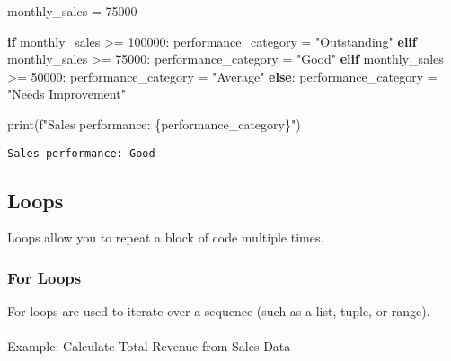 \documentclass[
  letterpaper,
  DIV=11,
  numbers=noendperiod]{scrreprt}
\makeatletter
\let\oldparagraph\paragraph
\renewcommand{\paragraph}{
    \@ifstar
      \xxxParagraphStar
      \xxxParagraphNoStar
  }
\newcommand{\xxxParagraphStar}[1]{\oldparagraph*{#1}\mbox{}}
\newcommand{\xxxParagraphNoStar}[1]{\oldparagraph{#1}\mbox{}}
\newenvironment{Shaded}{\begin{snugshade}}{\end{snugshade}}
\newcommand{\BuiltInTok}[1]{\textcolor[rgb]{0.00,0.23,0.31}{#1}}
\newcommand{\ControlFlowTok}[1]{\textcolor[rgb]{0.00,0.23,0.31}{\textbf{#1}}}
\newcommand{\DecValTok}[1]{\textcolor[rgb]{0.68,0.00,0.00}{#1}}
\newcommand{\KeywordTok}[1]{\textcolor[rgb]{0.00,0.23,0.31}{\textbf{#1}}}
\newcommand{\NormalTok}[1]{\textcolor[rgb]{0.00,0.23,0.31}{#1}}
\newcommand{\OperatorTok}[1]{\textcolor[rgb]{0.37,0.37,0.37}{#1}}
\newcommand{\SpecialCharTok}[1]{\textcolor[rgb]{0.37,0.37,0.37}{#1}}
\newcommand{\SpecialStringTok}[1]{\textcolor[rgb]{0.13,0.47,0.30}{#1}}
\newcommand{\StringTok}[1]{\textcolor[rgb]{0.13,0.47,0.30}{#1}}
\makeatother
\begin{document}
\begin{Shaded}
\begin{Highlighting}[]
\NormalTok{monthly\_sales }\OperatorTok{=} \DecValTok{75000}

\ControlFlowTok{if}\NormalTok{ monthly\_sales }\OperatorTok{\textgreater{}=} \DecValTok{100000}\NormalTok{:}
\NormalTok{    performance\_category }\OperatorTok{=} \StringTok{"Outstanding"}
\ControlFlowTok{elif}\NormalTok{ monthly\_sales }\OperatorTok{\textgreater{}=} \DecValTok{75000}\NormalTok{:}
\NormalTok{    performance\_category }\OperatorTok{=} \StringTok{"Good"}
\ControlFlowTok{elif}\NormalTok{ monthly\_sales }\OperatorTok{\textgreater{}=} \DecValTok{50000}\NormalTok{:}
\NormalTok{    performance\_category }\OperatorTok{=} \StringTok{"Average"}
\ControlFlowTok{else}\NormalTok{:}
\NormalTok{    performance\_category }\OperatorTok{=} \StringTok{"Needs Improvement"}

\BuiltInTok{print}\NormalTok{(}\SpecialStringTok{f"Sales performance: }\SpecialCharTok{\{}\NormalTok{performance\_category}\SpecialCharTok{\}}\SpecialStringTok{"}\NormalTok{)}
\end{Highlighting}
\end{Shaded}

\begin{verbatim}
Sales performance: Good
\end{verbatim}

\subsection{Loops}\label{loops-2}

Loops allow you to repeat a block of code multiple times.

\subsubsection{For Loops}\label{for-loops}

For loops are used to iterate over a sequence (such as a list, tuple, or
range).

\paragraph{Example: Calculate Total Revenue from Sales
Data}\label{example-calculate-total-revenue-from-sales-data}

\begin{Shaded}
\end{Shaded}
\end{document}
